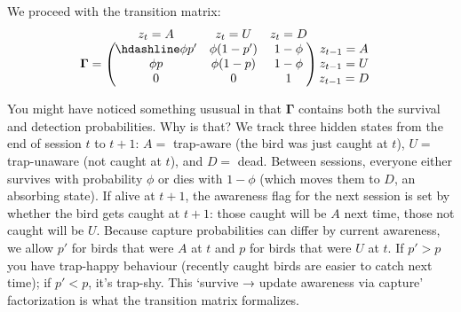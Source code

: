 \documentclass[
  12pt,
]{krantz}
\begin{document}
We proceed with the transition matrix:
\[\begin{matrix}
& \\
\mathbf{\Gamma} =
\left ( \vphantom{ \begin{matrix} 12 \\ 12 \\ 12 \end{matrix} } \right .
\end{matrix}
\hspace{-1.2em}
\begin{matrix}
z_t=A & z_t=U & z_t=D \\ \hdashline
\phi p' & \phi (1-p') & 1 - \phi\\
\phi p & \phi (1-p) & 1 - \phi\\
0 & 0 & 1
\end{matrix}
\hspace{-0.2em}
\begin{matrix}
& \\
\left . \vphantom{ \begin{matrix} 12 \\ 12 \\ 12 \end{matrix} } \right )
\begin{matrix}
z_{t-1}=A \\ z_{t-1}=U \\ z_{t-1}=D
\end{matrix}
\end{matrix}\]

You might have noticed something ususual in that \(\mathbf{\Gamma}\) contains both the survival and detection probabilities. Why is that? We track three hidden states from the end of session \(t\) to \(t+1\): \(A =\) trap-aware (the bird was just caught at \(t\)), \(U =\) trap-unaware (not caught at \(t\)), and \(D =\) dead. Between sessions, everyone either survives with probability \(\phi\) or dies with \(1 - \phi\) (which moves them to \(D\), an absorbing state). If alive at \(t+1\), the awareness flag for the next session is set by whether the bird gets caught at \(t+1\): those caught will be \(A\) next time, those not caught will be \(U\). Because capture probabilities can differ by current awareness, we allow \(p'\) for birds that were \(A\) at \(t\) and \(p\) for birds that were \(U\) at \(t\). If \(p'>p\) you have trap-happy behaviour (recently caught birds are easier to catch next time); if \(p'<p\), it's trap-shy. This `survive → update awareness via capture' factorization is what the transition matrix formalizes.
\end{document}
